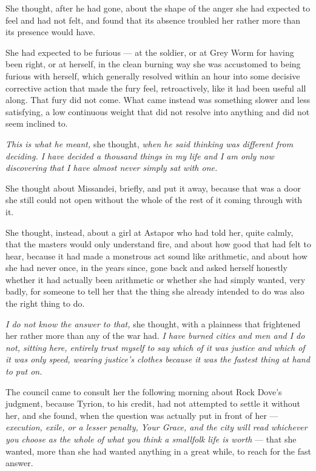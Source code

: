 She thought, after he had gone, about the shape of the anger she had expected to feel and had not felt, and found that its absence troubled her rather more than its presence would have.

She had expected to be furious — at the soldier, or at Grey Worm for having been right, or at herself, in the clean burning way she was accustomed to being furious with herself, which generally resolved within an hour into some decisive corrective action that made the fury feel, retroactively, like it had been useful all along. That fury did not come. What came instead was something slower and less satisfying, a low continuous weight that did not resolve into anything and did not seem inclined to.

\textit{This is what he meant,} she thought, \textit{when he said thinking was different from deciding. I have decided a thousand things in my life and I am only now discovering that I have almost never simply sat with one.}

She thought about Missandei, briefly, and put it away, because that was a door she still could not open without the whole of the rest of it coming through with it.

She thought, instead, about a girl at Astapor who had told her, quite calmly, that the masters would only understand fire, and about how good that had felt to hear, because it had made a monstrous act sound like arithmetic, and about how she had never once, in the years since, gone back and asked herself honestly whether it had actually been arithmetic or whether she had simply wanted, very badly, for someone to tell her that the thing she already intended to do was also the right thing to do.

\textit{I do not know the answer to that,} she thought, with a plainness that frightened her rather more than any of the war had. \textit{I have burned cities and men and I do not, sitting here, entirely trust myself to say which of it was justice and which of it was only speed, wearing justice’s clothes because it was the fastest thing at hand to put on.}

\sceneBreak

The council came to consult her the following morning about Rock Dove’s judgment, because Tyrion, to his credit, had not attempted to settle it without her, and she found, when the question was actually put in front of her — \textit{execution, exile, or a lesser penalty, Your Grace, and the city will read whichever you choose as the whole of what you think a smallfolk life is worth} — that she wanted, more than she had wanted anything in a great while, to reach for the fast answer.

